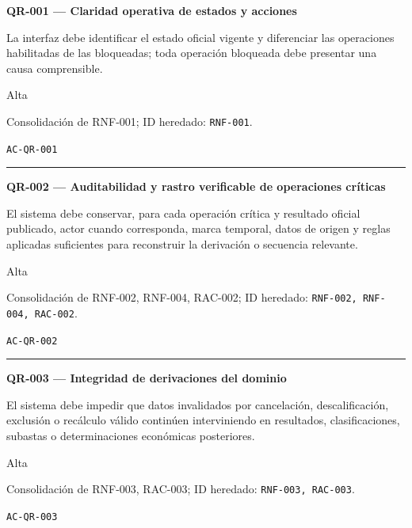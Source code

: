 \documentclass[10pt,letterpaper]{article}
\begin{document}
\noindent\textbf{QR-001 --- Claridad operativa de estados y acciones}\par
\begin{description}[style=nextline,leftmargin=3.15cm,labelwidth=2.8cm,font=\normalfont\bfseries]
\item[Obligación] La interfaz debe identificar el estado oficial vigente y diferenciar las operaciones habilitadas de las bloqueadas; toda operación bloqueada debe presentar una causa comprensible.
\item[Prioridad] Alta
\item[Procedencia] Consolidación de RNF-001; ID heredado: \texttt{RNF-001}.
\item[Verificación] \texttt{AC-QR-001}
\end{description}
\vspace{0.25em}\hrule\vspace{0.65em}
\noindent\textbf{QR-002 --- Auditabilidad y rastro verificable de operaciones críticas}\par
\begin{description}[style=nextline,leftmargin=3.15cm,labelwidth=2.8cm,font=\normalfont\bfseries]
\item[Obligación] El sistema debe conservar, para cada operación crítica y resultado oficial publicado, actor cuando corresponda, marca temporal, datos de origen y reglas aplicadas suficientes para reconstruir la derivación o secuencia relevante.
\item[Prioridad] Alta
\item[Procedencia] Consolidación de RNF-002, RNF-004, RAC-002; ID heredado: \texttt{RNF-002, RNF-004, RAC-002}.
\item[Verificación] \texttt{AC-QR-002}
\end{description}
\vspace{0.25em}\hrule\vspace{0.65em}
\noindent\textbf{QR-003 --- Integridad de derivaciones del dominio}\par
\begin{description}[style=nextline,leftmargin=3.15cm,labelwidth=2.8cm,font=\normalfont\bfseries]
\item[Obligación] El sistema debe impedir que datos invalidados por cancelación, descalificación, exclusión o recálculo válido continúen interviniendo en resultados, clasificaciones, subastas o determinaciones económicas posteriores.
\item[Prioridad] Alta
\item[Procedencia] Consolidación de RNF-003, RAC-003; ID heredado: \texttt{RNF-003, RAC-003}.
\item[Verificación] \texttt{AC-QR-003}
\end{description}
\end{document}
